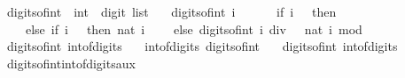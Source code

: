\begin{isabellebody}
\isanewline
{}\isamarkupfalse%
\ digits{\isacharunderscore}{\kern0pt}of{\isacharunderscore}{\kern0pt}int\ {\isacharcolon}{\kern0pt}{\isacharcolon}{\kern0pt}\ {\isachardoublequoteopen}int\ {\isasymRightarrow}\ digit\ list{\isachardoublequoteclose}\ \isanewline
\ \ {\isachardoublequoteopen}digits{\isacharunderscore}{\kern0pt}of{\isacharunderscore}{\kern0pt}int\ i\ {\isacharequal}{\kern0pt}\ \isanewline
\ \ \ \ {\isacharparenleft}{\kern0pt}if\ i\ {\isasymle}\ {}\ then\ {\isacharbrackleft}{\kern0pt}{\isacharbrackright}{\kern0pt}\isanewline
\ \ \ \ else\ if\ i\ {\isacharless}{\kern0pt}\ {}{}\ then\ {\isacharbrackleft}{\kern0pt}nat\ i{\isacharbrackright}{\kern0pt}\isanewline
\ \ \ \ else\ digits{\isacharunderscore}{\kern0pt}of{\isacharunderscore}{\kern0pt}int\ {\isacharparenleft}{\kern0pt}i\ div\ {}{}{\isacharparenright}{\kern0pt}\ {\isacharat}{\kern0pt}\ {\isacharbrackleft}{\kern0pt}nat\ {\isacharparenleft}{\kern0pt}i\ mod\ {}{}{\isacharparenright}{\kern0pt}{\isacharbrackright}{\kern0pt}{\isacharparenright}{\kern0pt}{\isachardoublequoteclose}\isanewline
\isanewline
{}\isamarkupfalse%
\ {\isachardoublequoteopen}digits{\isacharunderscore}{\kern0pt}of{\isacharunderscore}{\kern0pt}int\ {\isacharparenleft}{\kern0pt}int{\isacharunderscore}{\kern0pt}of{\isacharunderscore}{\kern0pt}digits\ {\isacharbrackleft}{\kern0pt}{}{\isacharcomma}{\kern0pt}{}{\isacharcomma}{\kern0pt}{}{\isacharcomma}{\kern0pt}{}{\isacharbrackright}{\kern0pt}\ {}{\isacharparenright}{\kern0pt}{\isachardoublequoteclose}\isanewline
{}\isamarkupfalse%
\ {\isachardoublequoteopen}int{\isacharunderscore}{\kern0pt}of{\isacharunderscore}{\kern0pt}digits\ {\isacharparenleft}{\kern0pt}digits{\isacharunderscore}{\kern0pt}of{\isacharunderscore}{\kern0pt}int\ {}{}{}{}{\isacharparenright}{\kern0pt}\ {}{\isachardoublequoteclose}\isanewline
\isanewline
{}\isamarkupfalse%
\ {\isachardoublequoteopen}digits{\isacharunderscore}{\kern0pt}of{\isacharunderscore}{\kern0pt}int\ {\isacharparenleft}{\kern0pt}int{\isacharunderscore}{\kern0pt}of{\isacharunderscore}{\kern0pt}digits\ {\isacharbrackleft}{\kern0pt}{}{\isacharbrackright}{\kern0pt}\ {}{}{}{\isacharparenright}{\kern0pt}{\isachardoublequoteclose}\isanewline
\isanewline
{}\isamarkupfalse%
\ digits{\isacharunderscore}{\kern0pt}of{\isacharunderscore}{\kern0pt}int{\isacharunderscore}{\kern0pt}int{\isacharunderscore}{\kern0pt}of{\isacharunderscore}{\kern0pt}digits{\isacharunderscore}{\kern0pt}aux{\isacharcolon}{\kern0pt}\isanewline

\end{isabellebody}

